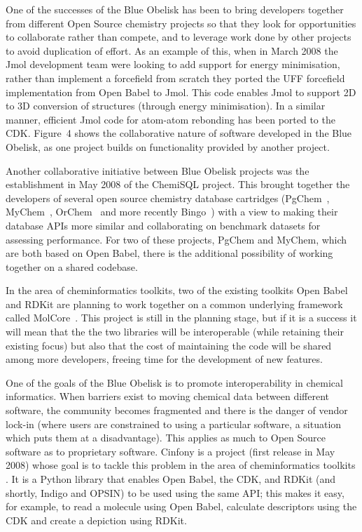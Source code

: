 \documentclass[10pt]{bmc_article}
\newenvironment{bmcformat}{\fussy\setboolean{publ}{true}}{\fussy}
\begin{document}
\begin{bmcformat}
One of the successes of the Blue Obelisk has been to bring developers
together from different Open Source chemistry projects so that they
look for opportunities to collaborate rather than compete, and to
leverage work done by other projects to avoid duplication of effort.
As an example of this, when in March 2008 the Jmol development team
were looking to add support for energy minimisation, rather than
implement a forcefield from scratch they ported the UFF forcefield~\cite{Rappe:1992um}
implementation from Open Babel to Jmol. This code enables Jmol to
support 2D to 3D conversion of structures (through energy
minimisation). In a similar manner, efficient Jmol code for atom-atom rebonding
has been ported to the CDK. Figure~4 shows the collaborative nature of
software developed in the Blue Obelisk, as one project builds on
functionality provided by another project.

Another collaborative initiative between Blue Obelisk projects was the establishment in May 2008 of
the ChemiSQL project. This brought together the developers of several
open source chemistry database cartridges (PgChem~\cite{WebPgChem},
MyChem~\cite{WebMyChem}, OrChem~\cite{RijnbeekS10} and
more recently Bingo~\cite{WebBingo}) with a view to making their database APIs more
similar and collaborating on benchmark datasets for assessing
performance. For two of these projects, PgChem and MyChem, which are both based on
Open Babel, there is the additional possibility of working together on a shared
codebase.

In the area of cheminformatics toolkits, two of the existing toolkits
Open Babel and RDKit are planning to work together on a common
underlying framework called MolCore~\cite{WebMolCore}. This project is still in the
planning stage, but if it is a success it will mean that the the two
libraries will be interoperable (while retaining their existing focus)
but also that the cost of maintaining the code will be shared among
more developers, freeing time for the development of new features.

One of the goals of the Blue Obelisk is to promote interoperability in chemical
informatics. When barriers exist to moving chemical data between
different software, the community becomes fragmented and there is
the danger of vendor lock-in (where users are constrained to using
a particular software, a situation which puts them at a
disadvantage). This applies as much to Open Source software as to
proprietary software. Cinfony is a project (first release in May 2008)
whose goal is to tackle this problem in the area of cheminformatics
toolkits \cite{OBoyleCinfony2008}.
It is a Python library that enables Open Babel, the CDK, and RDKit
(and shortly, Indigo and OPSIN) to
be used using the same API; this makes it easy, for example, to read a
molecule using Open Babel, calculate descriptors using the CDK and
create a depiction using RDKit.


\end{bmcformat}
\end{document}

